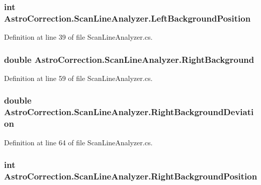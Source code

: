 \subsubsection[{LeftBackgroundPosition}]{\setlength{\rightskip}{0pt plus 5cm}int AstroCorrection.ScanLineAnalyzer.LeftBackgroundPosition\hspace{0.3cm}{\ttfamily  [get, set]}}\label{class_astro_correction_1_1_scan_line_analyzer_acdb3b5a53b43635f60d1d9b62504421b}


Definition at line 39 of file ScanLineAnalyzer.cs.
\subsubsection[{RightBackground}]{\setlength{\rightskip}{0pt plus 5cm}double AstroCorrection.ScanLineAnalyzer.RightBackground\hspace{0.3cm}{\ttfamily  [get, set]}}\label{class_astro_correction_1_1_scan_line_analyzer_adf22b766a041852a39004a36a38d35b9}


Definition at line 59 of file ScanLineAnalyzer.cs.
\subsubsection[{RightBackgroundDeviation}]{\setlength{\rightskip}{0pt plus 5cm}double AstroCorrection.ScanLineAnalyzer.RightBackgroundDeviation\hspace{0.3cm}{\ttfamily  [get, set]}}\label{class_astro_correction_1_1_scan_line_analyzer_afddc7b114af358acc0aa5fca2ea5e0ca}


Definition at line 64 of file ScanLineAnalyzer.cs.
\subsubsection[{RightBackgroundPosition}]{\setlength{\rightskip}{0pt plus 5cm}int AstroCorrection.ScanLineAnalyzer.RightBackgroundPosition\hspace{0.3cm}{\ttfamily  [get, set]}}\label{class_astro_correction_1_1_scan_line_analyzer_a8946b4fd40479263e925957cbd7b07fb}



